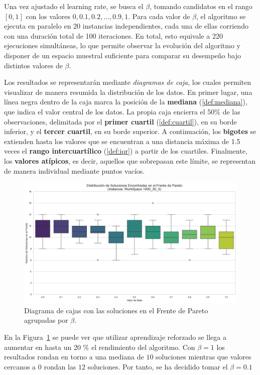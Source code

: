 \documentclass[12pt,a4paper]{book}
\begin{document}
Una vez ajustado el learning rate, se busca el $\beta$, tomando candidatos en el rango $[0,1]$ con los valores $0, 0.1, 0.2, \dots, 0.9, 1$.  
Para cada valor de $\beta$, el algoritmo se ejecuta en paralelo en 20 instancias independientes, cada una de ellas corriendo con una duración total de 100 iteraciones. 
En total, esto equivale a 220 ejecuciones simultáneas, lo que permite observar la evolución del algoritmo y disponer de un espacio muestral suficiente para comparar su desempeño bajo distintos valores de $\beta$.

Los resultados se representarán mediante \textit{diagramas de caja}, los cuales permiten visualizar de manera resumida la distribución de los datos. 
En primer lugar, una línea negra dentro de la caja marca la posición de la \textbf{mediana} (\ref{def:mediana}), que indica el valor central de los datos. 
La propia caja encierra el 50\% de las observaciones, delimitada por el \textbf{primer cuartil} (\ref{def:cuartil}), en su borde inferior, y el \textbf{tercer cuartil}, en su borde superior. 
A continuación, los \textbf{bigotes} se extienden hasta los valores que se encuentran a una distancia máxima de 1.5 veces el \textbf{rango intercuartílico} (\ref{def:iqr}) a partir de los cuartiles. 
Finalmente, los \textbf{valores atípicos}, es decir, aquellos que sobrepasan este límite, se representan de manera individual mediante puntos vacíos.
\begin{figure}[htbp!]
    \centering
    \includegraphics[width=0.8\linewidth]{images_finetuning/beta_20_100.png}
    \caption{Diagrama de cajas con las soluciones en el Frente de Pareto agrupadas por $\beta$.}
    \label{fig:beta}
\end{figure}

En la Figura~\ref{fig:beta} se puede ver que utilizar aprendizaje reforzado se llega a aumentar en hasta un 20 \% el rendimiento del algoritmo. Con $\beta=1$ los resultados rondan en torno a una mediana de $10$ soluciones mientras que valores cercanos a $0$ rondan las $12$ soluciones. Por tanto, se ha decidido tomar el $\beta=0.1$
\end{document}
